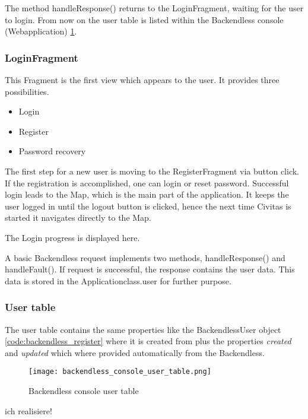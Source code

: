 \fbox{

}

The method handleResponse() returns to the LoginFragment, waiting for the user to login. From now on the user table is listed within the Backendless console (Webapplication) \ref{fig:backendlessConsoleUserTable}.


\subsubsection{LoginFragment}
This Fragment is the first view which appears to the user. It provides three possibilities. 
\begin{itemize}
\item Login
\item Register
\item Password recovery
\end{itemize}
The first step for a new user is moving to the RegisterFragment via button click.
If the registration is accomplished, one can login or reset password.
Successful login leads to the Map, which is the main part of the application. It keeps the user logged in until the logout button is clicked, hence the next time Civitas is started it navigates directly to the Map.

The Login progress is displayed here. 

\fbox{

}

A basic Backendless request implements two methods, handleResponse() and handleFault(). If request is successful, the response contains the user data. This data is stored in the Applicationclass.user for further purpose.

\subsubsection{User table}
The user table contains the same properties like the BackendlessUser object \ref{code:backendless_register} where it is created from plus the properties \textit{created} and \textit{updated} which where provided automatically from the Backendless.

\begin{figure}[H]
	\centering \texttt{[image: backendless\_console\_user\_table.png]}
	\caption[backendlessConsoleUserTable]{Backendless console user table}
	\label{fig:backendlessConsoleUserTable}
\end{figure}


ich realisiere!